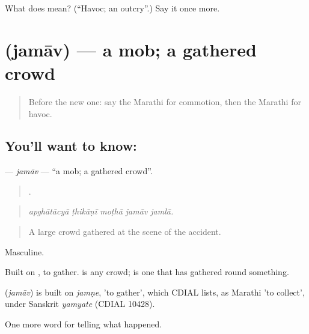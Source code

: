 \begin{tcolorbox}[breakable,colback=teal!4,colframe=teal!35!black,title={Before you move on}]
What does  mean? (\textquotedblleft{}Havoc; an outcry\textquotedblright{}.) Say it once more.
\end{tcolorbox}
\section[\texorpdfstring{\mr{जमाव} (jamāv)}{जमाव (jamāv)}]{ (jamāv) — a mob; a gathered crowd}

\label{lesson:MR-C298-jamav}



\begin{quote}
Before the new one: say the Marathi for commotion, then the Marathi for havoc.
\end{quote}

\subsection*{You'll want to know: }
\textbf{} — \emph{jamāv} — \textquotedblleft{}a mob; a gathered crowd\textquotedblright{}.

\begin{quote}
    .
\end{quote}

\begin{quote}
\emph{apghātācyā ṭhikāṇī moṭhā jamāv jamlā.}
\end{quote}

\begin{quote}
A large crowd gathered at the scene of the accident.
\end{quote}

Masculine.

Built on , to gather.  is any crowd;  is one that has gathered round something.

\begin{cousinweb}
\textbf{} (\emph{jamāv}) is built on \emph{jamṇe}, 'to gather', which CDIAL lists, as Marathi 'to collect', under Sanskrit \emph{yamyate} (CDIAL 10428).
\end{cousinweb}

\begin{grammarlens}[title={What you've built}]
One more word for telling what happened.
\end{grammarlens}

